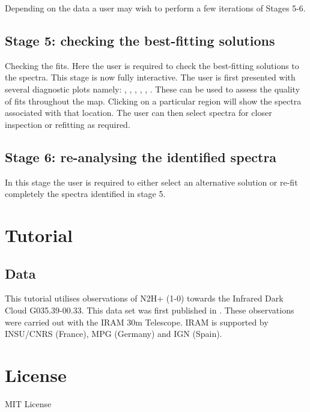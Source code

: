 \documentclass[letterpaper,10pt,english]{sphinxmanual}
\begin{document}
Depending on the data a user may wish to perform a few iterations of Stages 5-6.


\subsection{Stage 5: checking the best-fitting solutions}
\label{\detokenize{description:stage-5-checking-the-best-fitting-solutions}}
Checking the fits. Here the user is required to check the best-fitting
solutions to the spectra. This stage is now fully interactive. The user is first
presented with several diagnostic plots namely: , , ,
, , . These can be used to assess the quality of fits
throughout the map. Clicking on a particular region will show the spectra
associated with that location. The user can then select spectra for closer
inspection or refitting as required.


\subsection{Stage 6: re-analysing the identified spectra}
\label{\detokenize{description:stage-6-re-analysing-the-identified-spectra}}
In this stage the user is required to either select an alternative solution or
re-fit completely the spectra identified in stage 5.


\section{Tutorial}
\label{\detokenize{tutorial:tutorial}}\label{\detokenize{tutorial:id1}}\label{\detokenize{tutorial::doc}}

\subsection{Data}
\label{\detokenize{tutorial:data}}
This tutorial utilises observations of N2H+ (1-0) towards the Infrared Dark
Cloud G035.39-00.33. This data set was first published in .
These observations were carried out with the IRAM 30m Telescope. IRAM is
supported by INSU/CNRS (France), MPG (Germany) and IGN (Spain).


\section{License}
\label{\detokenize{license:license}}\label{\detokenize{license::doc}}
MIT License
\end{document}
